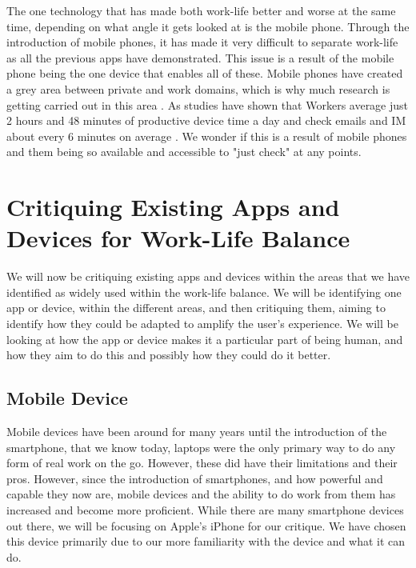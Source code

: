 \documentclass{sigchi}
\begin{document}
	The one technology that has made both work-life better and worse at the same time, depending on what angle it gets looked at is the mobile phone. Through the introduction of mobile phones, it has made it very difficult to separate work-life \cite{gronvall2016hci, sadler2006balancing} as all the previous apps have demonstrated. This issue is a result of the mobile phone being the one device that enables all of these. Mobile phones have created a grey area between private and work domains, which is why much research is getting carried out in this area \cite{fleck2015balancing}. As studies have shown that Workers average just 2 hours and 48 minutes of productive device time a day and check emails and IM about every 6 minutes on average \cite{rescuetime_study}. We wonder if this is a result of mobile phones and them being so available and accessible to "just check" at any points.
	
	\section{Critiquing Existing Apps and Devices for Work-Life Balance}
	
	We will now be critiquing existing apps and devices within the areas that we have identified as widely used within the work-life balance. We will be identifying one app or device, within the different areas, and then critiquing them, aiming to identify how they could be adapted to amplify the user's experience. We will be looking at how the app or device makes it a particular part of being human, and how they aim to do this and possibly how they could do it better.
	
		\subsection{Mobile Device}
		Mobile devices have been around for many years until the introduction of the smartphone, that we know today, laptops were the only primary way to do any form of real work on the go. However, these did have their limitations and their pros. However, since the introduction of smartphones, and how powerful and capable they now are, mobile devices and the ability to do work from them has increased and become more proficient. While there are many smartphone devices out there, we will be focusing on Apple's iPhone for our critique. We have chosen this device primarily due to our more familiarity with the device and what it can do. 
		
\end{document}
